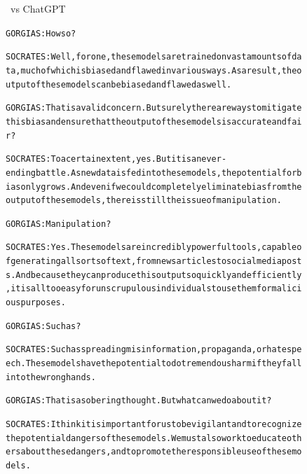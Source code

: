 \begin{figure}
\begin{AIbox}{\DV \ vs ChatGPT}
{\begin{alltt}
    GORGIAS: How so? \\\vspace{-2px}
    
    SOCRATES: Well, for one, these models are trained on vast amounts of data, much of which is biased and flawed in various ways. As a result, the output of these models can be biased and flawed as well. \\\vspace{-2px}
    
    GORGIAS: That is a valid concern. But surely there are ways to mitigate this bias and ensure that the output of these models is accurate and fair? \\\vspace{-2px}
    
    SOCRATES: To a certain extent, yes. But it is a never-ending battle. As new data is fed into these models, the potential for bias only grows. And even if we could completely eliminate bias from the output of these models, there is still the issue of manipulation. \\\vspace{-2px}
    
    GORGIAS: Manipulation? \\\vspace{-2px}
    
    SOCRATES: Yes. These models are incredibly powerful tools, capable of generating all sorts of text, from news articles to social media posts. And because they can produce this output so quickly and efficiently, it is all too easy for unscrupulous individuals to use them for malicious purposes. \\\vspace{-2px}
    
    GORGIAS: Such as? \\\vspace{-2px}
    
    SOCRATES: Such as spreading misinformation, propaganda, or hate speech. These models have the potential to do tremendous harm if they fall into the wrong hands. \\\vspace{-2px}
    
    GORGIAS: That is a sobering thought. But what can we do about it? \\\vspace{-2px}
    
    SOCRATES: I think it is important for us to be vigilant and to recognize the potential dangers of these models. We must also work to educate others about these dangers, and to promote the responsible use of these models. \\\vspace{-2px}
    

\end{alltt}}
\end{AIbox}
\end{figure}
